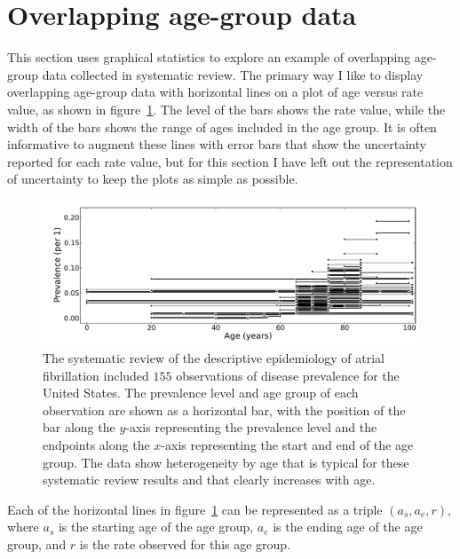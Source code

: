 \section{Overlapping age-group data}
\label{theory-age_group_model-overlapping_data}
This section uses graphical statistics to explore an example of overlapping age-group data
collected in systematic review.  The
primary way I like to display overlapping age-group data with horizontal
lines on a plot of age versus rate value, as shown in
figure~\ref{theory-age_group_model-dismod_data_plot}.  The level of the bars shows
the rate value, while the width of the bars shows the range of ages
included in the age group. It is often informative to augment these
lines with error bars that show the uncertainty reported for each rate
value, but for this section I have left out the representation of
uncertainty to keep the plots as simple as possible.

\begin{figure}[ht]
\begin{center}
\includegraphics[width=\textwidth]{af_ages_intervals.pdf}
\caption[Systematic review data for atrial fibrillation.]{The
  systematic review of the descriptive epidemiology of
  atrial fibrillation included $155$ observations of disease prevalence for the United States.
 The prevalence level and age group of
  each observation are shown as a horizontal bar, with the
  position of the bar along the $y$-axis representing the prevalence
  level and the endpoints along the $x$-axis representing the start and
  end of the age group.  The data show heterogeneity by age that is
  typical for these systematic review results and that clearly increases
 with age.  }
\label{theory-age_group_model-dismod_data_plot}
\end{center}
\end{figure}

Each of the horizontal lines in
figure~\ref{theory-age_group_model-dismod_data_plot} can be
represented as a triple $({a_s}, {a_e}, r)$, where $a_s$ is the
starting age of the age group, $a_e$ is the ending age of the
age group, and $r$ is the rate observed for this age group.


